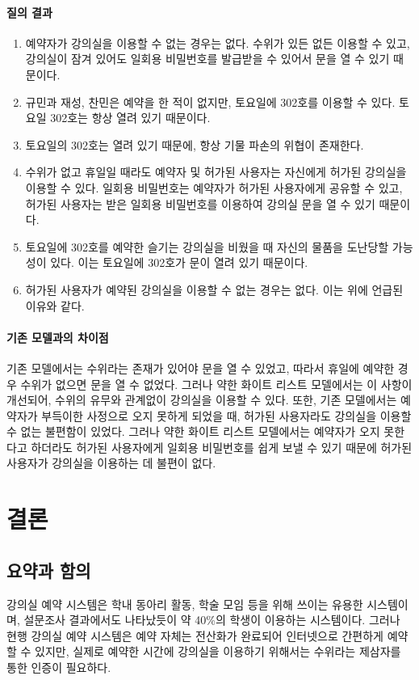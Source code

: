 \documentclass[11pt,a4paper]{article}
\begin{document}
\paragraph{질의 결과}
\begin{enumerate}
\item 예약자가 강의실을 이용할 수 없는 경우는 없다. 수위가 있든 없든 이용할 수 있고, 강의실이 잠겨 있어도 일회용 비밀번호를 발급받을 수 있어서 문을 열 수 있기 때문이다.
\item 규민과 재성, 찬민은 예약을 한 적이 없지만, 토요일에 302호를 이용할 수 있다. 토요일 302호는 항상 열려 있기 때문이다.
\item 토요일의 302호는 열려 있기 때문에, 항상 기물 파손의 위협이 존재한다.
\item 수위가 없고 휴일일 때라도 예약자 및 허가된 사용자는 자신에게 허가된 강의실을 이용할 수 있다. 일회용 비밀번호는 예약자가 허가된 사용자에게 공유할 수 있고, 허가된 사용자는 받은 일회용 비밀번호를 이용하여 강의실 문을 열 수 있기 때문이다.
\item 토요일에 302호를 예약한 슬기는 강의실을 비웠을 때 자신의 물품을 도난당할 가능성이 있다. 이는 토요일에 302호가 문이 열려 있기 때문이다.
\item 허가된 사용자가 예약된 강의실을 이용할 수 없는 경우는 없다. 이는 위에 언급된 이유와 같다.
\end{enumerate}

\paragraph{기존 모델과의 차이점}
\hfill\break
기존 모델에서는 수위라는 존재가 있어야 문을 열 수 있었고, 따라서 휴일에 예약한
경우 수위가 없으면 문을 열 수 없었다. 그러나 약한 화이트 리스트 모델에서는 이
사항이 개선되어, 수위의 유무와 관계없이 강의실을 이용할 수 있다.
또한, 기존 모델에서는 예약자가 부득이한 사정으로 오지 못하게 되었을 때, 허가된
사용자라도 강의실을 이용할 수 없는 불편함이 있었다. 그러나 약한 화이트 리스트
모델에서는 예약자가 오지 못한다고 하더라도 허가된 사용자에게 일회용 비밀번호를
쉽게 보낼 수 있기 때문에 허가된 사용자가 강의실을 이용하는 데 불편이 없다.

\section{결론}

\subsection{요약과 함의}
강의실 예약 시스템은 학내 동아리 활동, 학술 모임 등을 위해 쓰이는 유용한
시스템이며, 설문조사 결과에서도 나타났듯이 약 40\%의 학생이 이용하는
시스템이다. 그러나 현행 강의실 예약 시스템은 예약 자체는 전산화가 완료되어
인터넷으로 간편하게 예약할 수 있지만, 실제로 예약한 시간에 강의실을 이용하기
위해서는 수위라는 제삼자를 통한 인증이 필요하다.
\end{document}
